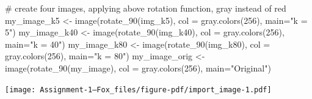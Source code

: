 \documentclass[
  letterpaper,
  DIV=11,
  numbers=noendperiod]{scrartcl}
\newenvironment{Shaded}{\begin{snugshade}}{\end{snugshade}}
\newcommand{\AttributeTok}[1]{\textcolor[rgb]{0.40,0.45,0.13}{#1}}
\newcommand{\CommentTok}[1]{\textcolor[rgb]{0.37,0.37,0.37}{#1}}
\newcommand{\DecValTok}[1]{\textcolor[rgb]{0.68,0.00,0.00}{#1}}
\newcommand{\FunctionTok}[1]{\textcolor[rgb]{0.28,0.35,0.67}{#1}}
\newcommand{\NormalTok}[1]{\textcolor[rgb]{0.00,0.23,0.31}{#1}}
\newcommand{\OtherTok}[1]{\textcolor[rgb]{0.00,0.23,0.31}{#1}}
\newcommand{\StringTok}[1]{\textcolor[rgb]{0.13,0.47,0.30}{#1}}
\begin{document}
\begin{Shaded}
\begin{Highlighting}[]
\CommentTok{\# create four images, applying above rotation function, gray instead of red}
\NormalTok{my\_image\_k5 }\OtherTok{\textless{}{-}} \FunctionTok{image}\NormalTok{(}\FunctionTok{rotate\_90}\NormalTok{(img\_k5), }\AttributeTok{col =} \FunctionTok{gray.colors}\NormalTok{(}\DecValTok{256}\NormalTok{), }\AttributeTok{main=}\StringTok{"k = 5"}\NormalTok{)}
\NormalTok{my\_image\_k40 }\OtherTok{\textless{}{-}} \FunctionTok{image}\NormalTok{(}\FunctionTok{rotate\_90}\NormalTok{(img\_k40), }\AttributeTok{col =} \FunctionTok{gray.colors}\NormalTok{(}\DecValTok{256}\NormalTok{), }\AttributeTok{main=}\StringTok{"k = 40"}\NormalTok{)}
\NormalTok{my\_image\_k80 }\OtherTok{\textless{}{-}} \FunctionTok{image}\NormalTok{(}\FunctionTok{rotate\_90}\NormalTok{(img\_k80), }\AttributeTok{col =} \FunctionTok{gray.colors}\NormalTok{(}\DecValTok{256}\NormalTok{), }\AttributeTok{main=}\StringTok{"k = 80"}\NormalTok{)}
\NormalTok{my\_image\_orig }\OtherTok{\textless{}{-}} \FunctionTok{image}\NormalTok{(}\FunctionTok{rotate\_90}\NormalTok{(my\_image), }\AttributeTok{col =} \FunctionTok{gray.colors}\NormalTok{(}\DecValTok{256}\NormalTok{), }\AttributeTok{main=}\StringTok{"Original"}\NormalTok{)}
\end{Highlighting}
\end{Shaded}

\texttt{[image: Assignment-1---Fox\_files/figure-pdf/import\_image-1.pdf]}
\end{document}

